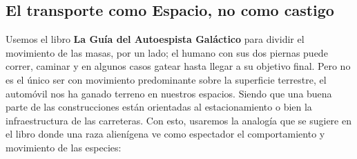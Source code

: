 \subsection{El transporte como Espacio, no como castigo}
\label{ssec:transporte-castigo-espacio}

Usemos el libro \textbf{La Guía del Autoespista Galáctico} \cite{adams1979hitchhiker} para dividir el movimiento de 
las masas, por un lado; el humano con sus dos piernas puede correr, caminar y en algunos casos gatear hasta llegar a 
su objetivo final. Pero no es el único ser con movimiento predominante sobre la superficie terrestre, el automóvil 
nos ha ganado terreno en nuestros espacios. Siendo que una buena parte de las construcciones están orientadas al 
estacionamiento o bien la infraestructura de las carreteras. Con esto, usaremos la analogía que se sugiere en el libro 
donde una raza alienígena ve como espectador el comportamiento y movimiento de las especies:


